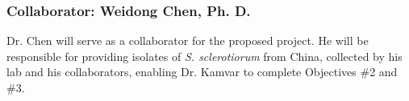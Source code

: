 \documentclass[12pt,letterpaper]{article}
\begin{document}
\subsubsection*{Collaborator: Weidong Chen, Ph. D.}

\noindent Dr. Chen will serve as a collaborator for the proposed project.
He will be responsible for providing isolates of \textit{S. sclerotiorum} from China, collected by his lab and his collaborators, enabling Dr. Kamvar to complete Objectives \#2 and \#3.
\end{document}

